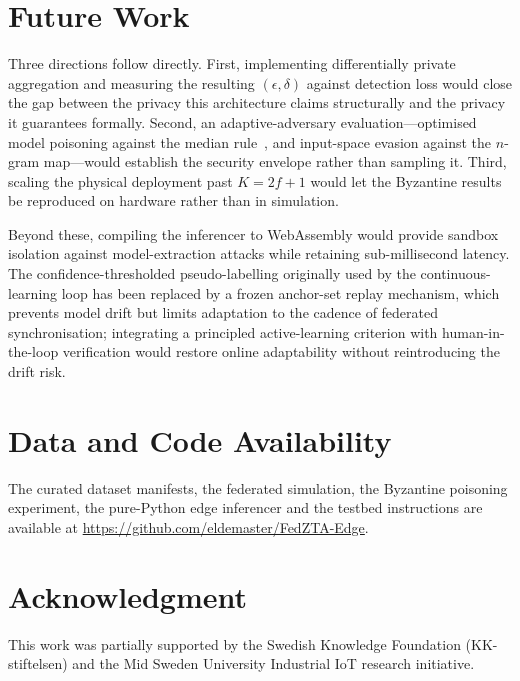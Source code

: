 \documentclass[conference]{IEEEtran}
\begin{document}
\section{Future Work}
\label{sec:future}
Three directions follow directly. First, implementing differentially private aggregation and measuring the resulting $(\epsilon,\delta)$ against detection loss would close the gap between the privacy this architecture claims structurally and the privacy it guarantees formally. Second, an adaptive-adversary evaluation---optimised model poisoning against the median rule~\cite{fang2020}, and input-space evasion against the $n$-gram map---would establish the security envelope rather than sampling it. Third, scaling the physical deployment past $K = 2f+1$ would let the Byzantine results be reproduced on hardware rather than in simulation.

Beyond these, compiling the inferencer to WebAssembly would provide sandbox isolation against model-extraction attacks while retaining sub-millisecond latency. The confidence-thresholded pseudo-labelling originally used by the continuous-learning loop has been replaced by a frozen anchor-set replay mechanism, which prevents model drift but limits adaptation to the cadence of federated synchronisation; integrating a principled active-learning criterion with human-in-the-loop verification would restore online adaptability without reintroducing the drift risk.

\section*{Data and Code Availability}
The curated dataset manifests, the federated simulation, the Byzantine poisoning experiment, the pure-Python edge inferencer and the testbed instructions are available at \url{https://github.com/eldemaster/FedZTA-Edge}.

\section*{Acknowledgment}
This work was partially supported by the Swedish Knowledge Foundation (KK-stiftelsen) and the Mid Sweden University Industrial IoT research initiative.
\end{document}
